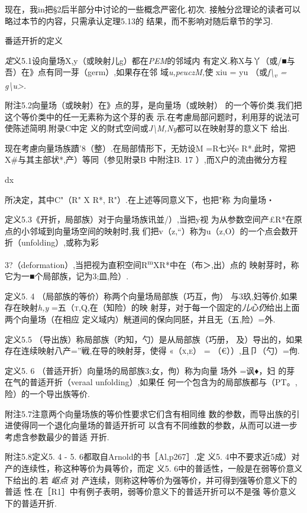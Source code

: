 \documentclass{article}
\begin{document}
现在，我in把§2后半部分中讨论的一些概念严密化.初次.
接触分岔理论的读者可以略过本节的内容，只需承认定理5.13的
结果，而不影响对随后章节的学习.

番适开折的定义

\emph{定}义5.1设向量场X,y（或映射儿g）都在\emph{PEM}的邻域内
有定义.称X与丫（或/■与吾）在》点有同一芽（germ）,如果存在邻
域\emph{u,peuczM,}使 xiu = y\textbar{}u
（或\emph{f\textbackslash{}\textsubscript{v} =
g\textbackslash{}u\textgreater{}.}

附注5.2向量场（或映射）在》点的芽，是向量场（或映射）
的一个等价类.我们把这个等价类中的任一无素称为这个芽的表
示.在考慮局部问题时，利用芽的说法可使陈述简明.附录C中定
义的財式空间或\emph{J\textbackslash{}M,Ny}都可以在映射芽的意义下 给出.

现在考慮向量场族蹟'8（整）.在局部情形下，无妨设M =R七兴e
R*.此时，常把X\#与其主部状*,产）等同（参见附录B 中附注B. 17
）,而X户的流由微分方程

dx

所决定，其中C"（R" X R*, R"）.在上述等同意义下，也把"称 为向量场・

定义5.3《开折，局部族）对于向量场族讯並/）,当把y视
为从参数空间产£R*在原点的小邻域到向量场空间的映射时,我
们把v（z,``）称为u（z,O）的一个点会数开折（unfolding）,或称为彩

3?（deformation）,当把视为直积空间R\textsuperscript{m}XR*中在（布＞,出）点的
映射芽时，称它为一■个局部族，记为3;皿,险）.

定义5. 4 （局部族的等价）称两个向量场局部族（巧互，佝）
与3玖,妇等价,如果存在映射\emph{h,y} =五\textsc{（t,Q,}在（知险）的映
射芽，对于每一个固定的\emph{儿心仍}给出上面两个向量场（在相应
定义域内）觥道间的保向同胚，并且无（五,险）=外.

定义5.5 （导出族）称局部族（旳知，勺）是从局部族（巧册，
及）导出的，如果存在连续映射八产=''戦,在导的映射芽，使得
\textsc{«（x,e） =} （€））,且卩（勺）=佝.

定义5. 6 （普适开折）向量场的局部族3;女，佝）称为向量 场外 =讽♦，妇
的芽在气的普适开折（veraal unfolding）,如果任
何一个包含为的局部族都与（PT。,险）的一个导出族等价.

附注5.7注意两个向量场族的等价性要求它们含有相同维
数的参数，而导出族的引进使得同一个退化向量场的普适开折可
以含有不同维数的参数，从而可以进一步考虑含参数最少的普适 开折.

附注5.8定义5. 4 - 5. 6都取自Arnold的书［Al,p267］.定 义5.
4中不要求近5成）对产的连续性，称这种等价为員等价，而定 义5.
6中的普适性，一般是在弱等价意义下给出的.若 \emph{岖点} 对
产连续，则称这种等价为强等价，并可得到强等价意义下的普适
性.在［R1］中有例子表明，弱等价意义下的普适开折可以不是强
等价意义下的普适开折.
\end{document}
